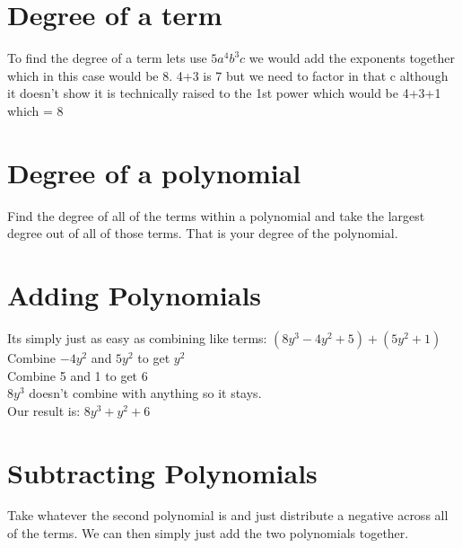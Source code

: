 \documentclass{article}
\begin{document}
\section{Degree of a term}
To find the degree of a term lets use $5a^4b^3c$ we would add the exponents together which in this case would be 8. 4+3 is 7 but we need to factor in that c although it doesn't show it is technically raised to the 1st power which would be 4+3+1 which = 8
\section{Degree of a polynomial}
Find the degree of all of the terms within a polynomial and take the largest degree out of all of those terms. That is your degree of the polynomial. 

\section{Adding Polynomials}
Its simply just as easy as combining like terms:
$(8y^3-4y^2+5) + (5y^2+1)$ \\ Combine $-4y^2$ and $5y^2$ to get $y^2$ \\ Combine 5 and 1 to get 6 \\ $8y^3$ doesn't combine with anything so it stays. \\ Our result is: $8y^3 + y^2 + 6$

\section{Subtracting Polynomials}
Take whatever the second polynomial is and just distribute a negative across all of the terms. We can then simply just add the two polynomials together.
\end{document}
